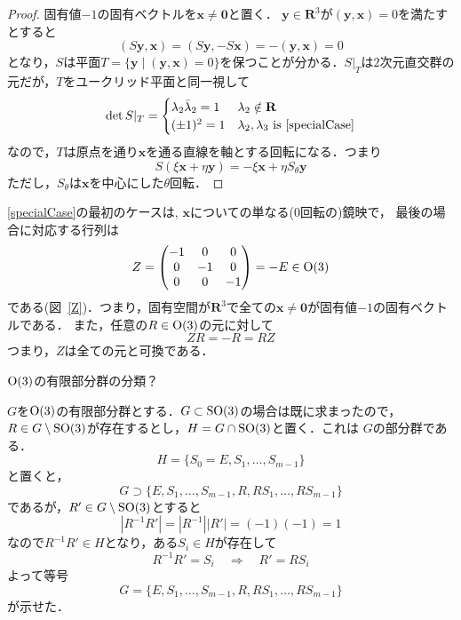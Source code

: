 \begin{proof}
   \emptyline
   固有値$-1$の固有ベクトルを$\mathbf x\neq\mathbf 0 $と置く．
   $\mathbf y\in\mathbf R^3$が$(\mathbf y,\mathbf x)=0$を満たすとすると
   \[
        (S\mathbf y,\mathbf x)
        =
        (S\mathbf y,-S\mathbf x)
        =
        -(\mathbf y,\mathbf x)
        =
        0
   \]
   となり，$S$は平面$T=\{\mathbf y\mid (\mathbf y,\mathbf x)=0\}$を保つことが分かる．$S|_T$は$2$次元直交群の元だが，$T$をユークリッド平面と同一視して
   \[
        \det S|_T=
        \begin{cases}
             \lambda_2\bar \lambda_2=1& \lambda_2\notin \mathbf R\\
             (\pm1)^2=1  & \lambda_2,\lambda_3  \text{ is }
                \eqref{specialCase}
        \end{cases}
   \]
   なので，$T$は原点を通り$\mathbf x$を通る直線を軸とする回転になる．つまり
   \[
        S(\xi \mathbf x+ \eta \mathbf y)
        = -\xi \mathbf x+ \eta S_{\theta}\mathbf y
   \]
   ただし，$S_{\theta}$は$ \mathbf x$を中心にした$\theta$回転．
\end{proof}
\eqref{specialCase}の最初のケースは, $\mathbf x$についての単なる($0$回転の)鏡映で，
最後の場合に対応する行列は
\[
     Z=
     \begin{pmatrix}
          -1&0&0\\
          0&-1&0\\
          0&0&-1\\
     \end{pmatrix}
     =-E\in \operatorname{O}(3)
\]
である(図~\ref{Z})．つまり，固有空間が$\mathbf R^3$で全ての$\mathbf x\neq \mathbf 0$が固有値$-1$の固有ベクトルである．
また，任意の$R\in \operatorname{O}(3)$の元に対して
\[
     ZR = -R = RZ
\]
つまり，$Z$は全ての元と可換である．

\begin{Q}
   $\operatorname{O}(3)$の有限部分群の分類？
\end{Q}
$G$を$\operatorname{O}(3)$の有限部分群とする．$G\subset \operatorname{SO}(3)$の場合は既に求まったので，$R\in G\setminus  \operatorname{SO}(3)$が存在するとし，$H=G\cap \operatorname{SO}(3)$と置く．これは
$G$の部分群である．
\[
     H =\{S_0=E, S_1, \dots , S_{m-1}\}
\]
と置くと，
\[
     G\supset \{E, S_1, \dots , S_{m-1},R,RS_1, \dots , RS_{m-1}\}
\]
であるが，$R'\in G\setminus  \operatorname{SO}(3)$とすると
\[
     |R^{-1}R'|=|R^{-1}||R'|=(-1)(-1)=1
\]
なので$R^{-1}R'\in H$となり，ある$S_i\in H$が存在して
\[
     R^{-1}R'=S_i\quad\Rightarrow\quad R'=RS_i
\]
よって等号
\begin{equation}\label{G}
     G= \{E, S_1, \dots , S_{m-1},R,RS_1, \dots , RS_{m-1}\}
\end{equation}
が示せた．
\emptyline

